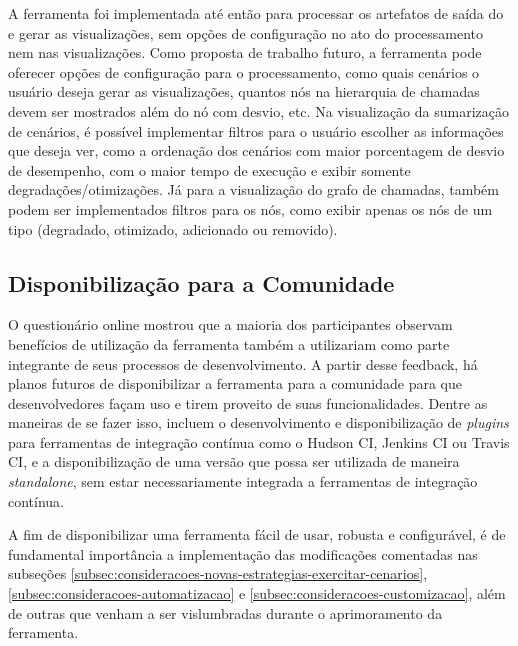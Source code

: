 A ferramenta foi implementada até então para processar os artefatos de saída do \textit{\perfMinerName} e gerar as visualizações, sem opções de configuração no ato do processamento nem nas visualizações. Como proposta de trabalho futuro, a ferramenta pode oferecer opções de configuração para o processamento, como quais cenários o usuário deseja gerar as visualizações, quantos nós na hierarquia de chamadas devem ser mostrados além do nó com desvio, etc. Na visualização da sumarização de cenários, é possível implementar filtros para o usuário escolher as informações que deseja ver, como a ordenação dos cenários com maior porcentagem de desvio de desempenho, com o maior tempo de execução e exibir somente degradações/otimizações. Já para a visualização do grafo de chamadas, também podem ser implementados filtros para os nós, como exibir apenas os nós de um tipo (degradado, otimizado, adicionado ou removido).

\subsection{Disponibilização para a Comunidade}

O questionário online mostrou que a maioria dos participantes observam benefícios de utilização da ferramenta também a utilizariam como parte integrante de seus processos de desenvolvimento. A partir desse feedback, há planos futuros de disponibilizar a ferramenta para a comunidade para que desenvolvedores façam uso e tirem proveito de suas funcionalidades. Dentre as maneiras de se fazer isso, incluem o desenvolvimento e disponibilização de \textit{plugins} para ferramentas de integração contínua como o Hudson CI, Jenkins CI ou Travis CI, e a disponibilização de uma versão que possa ser utilizada de maneira \textit{standalone}, sem estar necessariamente integrada a ferramentas de integração contínua.

A fim de disponibilizar uma ferramenta fácil de usar, robusta e configurável, é de fundamental importância a implementação das modificações comentadas nas subseções \ref{subsec:consideracoes-novas-estrategias-exercitar-cenarios}, \ref{subsec:consideracoes-automatizacao} e \ref{subsec:consideracoes-customizacao}, além de outras que venham a ser vislumbradas durante o aprimoramento da ferramenta.